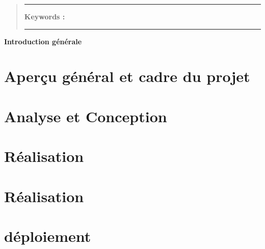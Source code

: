 \documentclass{myReport}
\begin{document}
\begin{abstract}

\vspace{1cm}


\noindent\rule[2pt]{\textwidth}{0.5pt}

{\textbf{Keywords :}}
\\ 
 
\noindent\rule[2pt]{\textwidth}{0.5pt}
\end{abstract}

\newpage

\tableofcontents
\listoffigures
\newpage
{}
\vspace*{2cm}
\begin{center}
    {\LARGE \textbf{Introduction générale}}
\end{center}
\vspace{2cm}


\newpage
\makeheader
\chapter{Aperçu général et cadre du projet}
\newpage

\chapter{Analyse et Conception}
\newpage

\newpage
\chapter{Réalisation}
\newpage

\newpage
\chapter{Réalisation}
\newpage



\chapter{déploiement}

\newpage



\nocite{*} 
 
\renewcommand{\bibname}{Ressources} 
 
\thispagestyle{empty}
\end{document}
